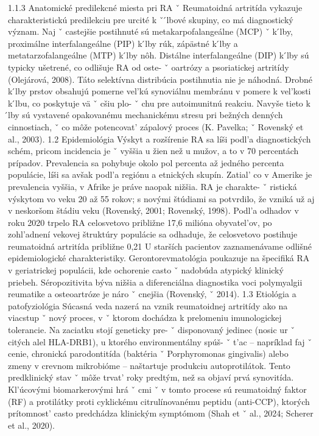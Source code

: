{ 1.1.3 Anatomické predilekcné miesta pri RA ˇ Reumatoidná artritída vykazuje charakteristickú predilekciu pre urcité k ˇ  ́lbové skupiny, co má diagnostický význam. Naj ˇ castejšie postihnuté sú metakarpofalangeálne (MCP) ˇ k ́lby, proximálne interfalangeálne (PIP) k ́lby rúk, zápästné k ́lby a metatarzofalangeálne (MTP) k ́lby nôh. Distálne interfalangeálne (DIP) k ́lby sú typicky ušetrené, co odlišuje RA od oste- ˇ oartrózy a psoriatickej artritídy (Olejárová, 2008).
 Táto selektívna distribúcia postihnutia nie je náhodná. Drobné k ́lby prstov obsahujú pomerne vel’kú synoviálnu membránu v pomere k vel’kosti k ́lbu, co poskytuje vä ˇ cšiu plo- ˇ chu pre autoimunitnú reakciu. Navyše tieto k ́lby sú vystavené opakovanému mechanickému stresu pri bežných denných cinnostiach, ˇ co môže potencovat’ zápalový proces (K. Pavelka; ˇ Rovenský et al., 2003).
 1.2 Epidemiológia Výskyt a rozšírenie RA sa líši podl’a diagnostických schém, pricom incidencia je ˇ vyššia u žien než u mužov, a to v 70 percentách prípadov. Prevalencia sa pohybuje okolo pol percenta až jedného percenta populácie, líši sa avšak podl’a regiónu a etnických skupín.
 Zatial’ co v Amerike je prevalencia vyššia, v Afrike je práve naopak nižšia. RA je charakte- ˇ ristická výskytom vo veku 20 až 55 rokov; s novými štúdiami sa potvrdilo, že vzniká už aj v neskoršom štádiu veku (Rovenský, 2001; Rovenský, 1998).
 Podl’a odhadov v roku 2020 trpelo RA celosvetovo približne 17,6 milióna obyvatel’ov, po zohl’adnení vekovej štruktúry populácie sa odhaduje, že celosvetovo postihuje reumatoidná artritída približne 0,21 %
 U starších pacientov zaznamenávame odlišné epidemiologické charakteristiky. Gerontorevmatológia poukazuje na špecifiká RA v geriatrickej populácii, kde ochorenie casto ˇ nadobúda atypický klinický priebeh. Séropozitivita býva nižšia a diferenciálna diagnostika voci polymyalgii reumatike a osteoartróze je náro ˇ cnejšia (Rovenský, ˇ 2014).
 1.3 Etiológia a patofyziológia Súcasná veda nazerá na vznik reumatoidnej artritídy ako na viacstup ˇ nový proces, v ˇ ktorom dochádza k prelomeniu imunologickej tolerancie. Na zaciatku stojí geneticky pre- ˇ disponovaný jedinec (nosic ur ˇ citých alel HLA-DRB1), u ktorého environmentálny spúš- ˇ t’ac – napríklad faj ˇ cenie, chronická parodontitída (baktéria ˇ Porphyromonas gingivalis) alebo zmeny v crevnom mikrobióme – naštartuje produkciu autoprotilátok. Tento predklinický stav ˇ môže trvat’ roky predtým, než sa objaví prvá synovitída. Kl’úcovými biomarkerovými hrá ˇ cmi ˇ v tomto procese sú reumatoidný faktor (RF) a protilátky proti cyklickému citrulínovanému peptidu (anti-CCP), ktorých prítomnost’ casto predchádza klinickým symptómom (Shah et ˇ al., 2024; Scherer et al., 2020).
}
